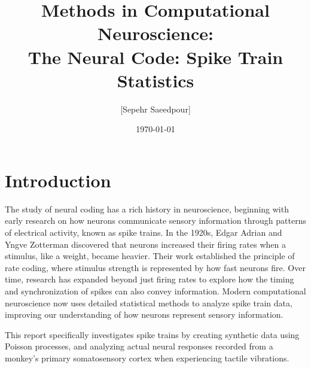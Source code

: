 \documentclass{article}
\title{Methods in Computational Neuroscience:\\The Neural Code: Spike Train Statistics}
\author{[Sepehr Saeedpour]}
\date{\today}
\begin{document}
\maketitle


\section*{Introduction}

The study of neural coding has a rich history in neuroscience, beginning with early research on how neurons communicate sensory information through patterns of electrical activity, known as spike trains. In the 1920s, Edgar Adrian and Yngve Zotterman discovered that neurons increased their firing rates when a stimulus, like a weight, became heavier. Their work established the principle of rate coding, where stimulus strength is represented by how fast neurons fire. Over time, research has expanded beyond just firing rates to explore how the timing and synchronization of spikes can also convey information. Modern computational neuroscience now uses detailed statistical methods to analyze spike train data, improving our understanding of how neurons represent sensory information. 

This report specifically investigates spike trains by creating synthetic data using Poisson processes, and analyzing actual neural responses recorded from a monkey’s primary somatosensory cortex when experiencing tactile vibrations.
\end{document}
